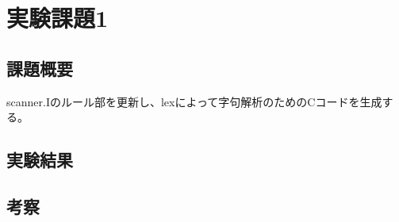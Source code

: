 \section{実験課題1}
\subsection{課題概要}
scanner.Iのルール部を更新し、lexによって字句解析のためのCコードを生成する。

\subsection{実験結果}

\subsection{考察}
